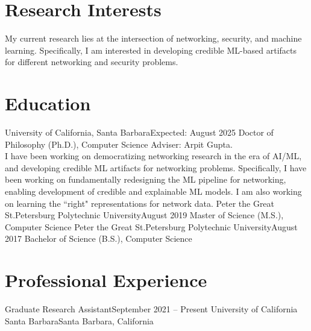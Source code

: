 \documentclass{scv}
\begin{document}

\section{Research Interests}
    \justifying
    My current research lies at the intersection of networking, security, and machine learning. Specifically, I am interested in developing credible ML-based artifacts for different networking and security problems.
\vspace{-10pt}

\section{Education}
  \resumeSubHeadingListStart
    \resumeSubheadingWithText
      {University of California, Santa Barbara}{Expected: August 2025}
      {Doctor of Philosophy (Ph.D.), Computer Science}{}
      {
        Adviser: Arpit Gupta.\\
        I have been working on democratizing networking research in the era of AI/ML, and developing credible ML artifacts for networking problems. Specifically, I have been working on fundamentally redesigning the ML pipeline for networking, enabling development of credible and explainable ML models. I am also working on learning the ``right" representations for network data.}{}
    \resumeSubheading
      {Peter the Great St.Petersburg Polytechnic University}{August 2019}
      {Master of Science (M.S.), Computer Science}{}
    \resumeSubheading
      {Peter the Great St.Petersburg Polytechnic University}{August 2017}
      {Bachelor of Science (B.S.), Computer Science}{}
  \resumeSubHeadingListEnd
    
\vspace{-10pt}
\section{Professional Experience}
  \resumeSubHeadingListStart

    \resumeSubheading 
      {Graduate Research Assistant}{September 2021 -- Present}
      {University of California Santa Barbara}{Santa Barbara, California}
      \resumeItemListStart
      \resumeItemListEnd
\end{document}
